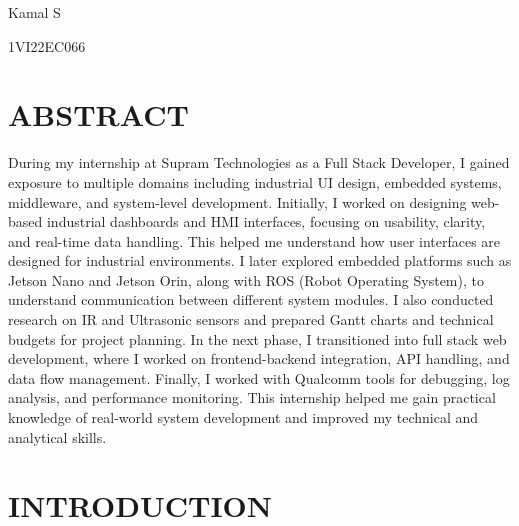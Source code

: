 \documentclass[12pt,a4paper]{report}
\begin{document}
\vspace{0.5cm}
Kamal S\par
1VI22EC066\par

\newpage
\chapter*{ABSTRACT}


During my internship at Supram Technologies as a Full Stack Developer, I gained exposure to multiple domains including industrial UI design, embedded systems, middleware, and system-level development. Initially, I worked on designing web-based industrial dashboards and HMI interfaces, focusing on usability, clarity, and real-time data handling. This helped me understand how user interfaces are designed for industrial environments. I later explored embedded platforms such as Jetson Nano and Jetson Orin, along with ROS (Robot Operating System), to understand communication between different system modules. I also conducted research on IR and Ultrasonic sensors and prepared Gantt charts and technical budgets for project planning. In the next phase, I transitioned into full stack web development, where I worked on frontend-backend integration, API handling, and data flow management. Finally, I worked with Qualcomm tools for debugging, log analysis, and performance monitoring. This internship helped me gain practical knowledge of real-world system development and improved my technical and analytical skills.


\newpage
\tableofcontents
{}

\newpage
\listoffigures
{}

\chapter{INTRODUCTION}
\end{document}
